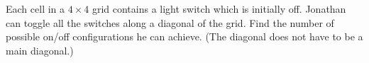 Each cell in a $4\times 4$ grid contains a light switch which is initially off. Jonathan can toggle all the switches along a diagonal of the grid. Find the number of possible on/off configurations he can achieve. (The diagonal does not have to be a main diagonal.)
